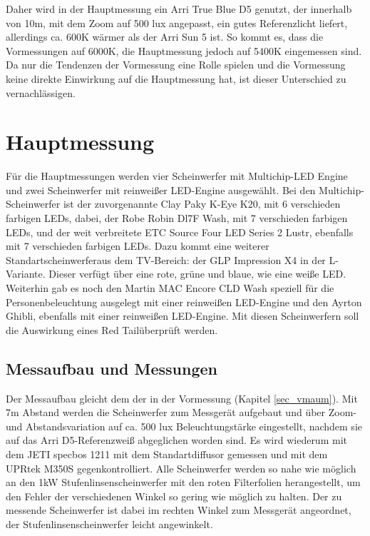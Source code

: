 Daher wird in der Hauptmessung ein Arri True Blue D5 genutzt, der innerhalb von 10m, mit dem Zoom auf 500 lux angepasst, ein gutes Referenzlicht liefert, allerdings ca. 600K wärmer als der Arri Sun 5 ist. So kommt es, dass die Vormessungen auf 6000K, die Hauptmessung jedoch auf 5400K eingemessen sind. Da nur die Tendenzen der Vormessung eine Rolle spielen und die Vormessung keine direkte Einwirkung auf die Hauptmessung hat, ist dieser Unterschied zu vernachlässigen.


\chapter{Hauptmessung}
Für die Hauptmessungen werden vier Scheinwerfer mit Multichip-LED Engine und zwei Scheinwerfer mit reinweißer LED-Engine ausgewählt. Bei den Multichip-Scheinwerfer ist der zuvorgenannte Clay Paky K-Eye K20, mit 6 verschieden farbigen LEDs, dabei, der Robe Robin Dl7F Wash, mit 7 verschieden farbigen LEDs, und der weit verbreitete ETC Source Four LED Series 2 Lustr, ebenfalls mit 7 verschieden farbigen LEDs. Dazu kommt eine weiterer \glqq Standartscheinwerfer\grqq aus dem TV-Bereich: der GLP Impression X4 in der \glqq L\grqq - Variante. Dieser verfügt über eine rote, grüne und blaue, wie eine weiße LED. Weiterhin gab es noch den Martin MAC Encore CLD Wash speziell für die Personenbeleuchtung ausgelegt mit einer reinweißen LED-Engine und den Ayrton Ghibli, ebenfalls mit einer reinweißen LED-Engine. 
Mit diesen Scheinwerfern soll die Auswirkung eines \glqq Red Tail\grqq überprüft werden.



\section{Messaufbau und Messungen}
\label{sec_hmaufbau}
Der Messaufbau gleicht dem der in der Vormessung (Kapitel \ref{sec_vmaum}). Mit 7m Abstand werden die Scheinwerfer zum Messgerät aufgebaut und über Zoom- und Abstandsvariation auf ca. 500 lux Beleuchtungstärke eingestellt, nachdem sie auf das Arri D5-Referenzweiß abgeglichen worden sind. Es wird wiederum mit dem JETI specbos 1211 mit dem Standartdiffusor gemessen und mit dem UPRtek M350S gegenkontrolliert. Alle Scheinwerfer werden so nahe wie möglich an den 1kW Stufenlinsenscheinwerfer mit den roten Filterfolien herangestellt, um den Fehler der verschiedenen Winkel so gering wie möglich zu halten. Der zu messende Scheinwerfer ist dabei im rechten Winkel zum Messgerät angeordnet, der Stufenlinsenscheinwerfer leicht angewinkelt. 

